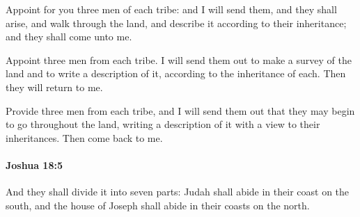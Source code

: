 			\begin{versebox}
					\item[BHS] 
					\item[ASV] Appoint for you three men of each tribe: and I will send them, and they shall arise, and walk through the land, and describe it according to their inheritance; and they shall come unto me.
					\item[NIV] Appoint three men from each tribe. I will send them out to make a survey of the land and to write a description of it, according to the inheritance of each. Then they will return to me.
					\item[NRSV] Provide three men from each tribe, and I will send them out that they may begin to go throughout the land, writing a description of it with a view to their inheritances. Then come back to me.
			\end{versebox}

		\paragraph{Joshua 18:5} %
			\label{JOSHUA-18-5}

			And they shall divide it into seven parts: Judah shall abide in their coast on the south, and the house of Joseph shall abide in their coasts on the north.

